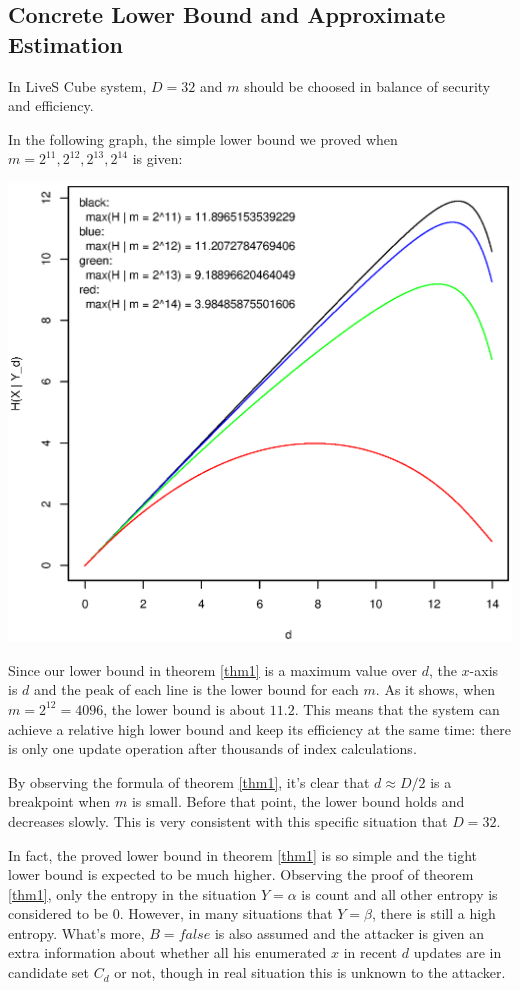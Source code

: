 \documentclass[10pt,a4paper]{article}
\begin{document}
	\subsection{Concrete Lower Bound and Approximate Estimation}
		In LiveS Cube system, $D = 32$ and $m$ should be
		choosed in balance of security and efficiency.
		
		In the following graph, the simple lower
		bound we proved when $m = 2^{11}, 2^{12}, 2^{13}, 2^{14}$ is given:
		
		\begin{center}
		\includegraphics[scale=0.6]{lb_m.eps}
		\end{center}
		
		Since our lower bound in theorem \ref{thm1} is a maximum value
		over $d$, the $x$-axis is $d$ and the peak of each line
		is the lower bound for each $m$. As it shows, when $m = 2^{12} = 4096$, the lower
		bound is about $11.2$. This means that the system can achieve
		a relative high lower bound and keep its efficiency at the same time:
		there is only one update operation after thousands of index calculations.
		
		By observing the formula
		of theorem \ref{thm1}, it's clear that $d \approx D/2$ is a
		breakpoint when $m$ is small. Before that point, the lower bound holds and
		decreases slowly. This is very consistent with this
		specific situation that $D = 32$.
		
		In fact, the proved lower bound in theorem \ref{thm1} is so
		simple and the tight lower bound is expected to be much higher.
		Observing the proof of theorem \ref{thm1}, only the
		entropy in the situation $Y = \alpha$ is count and
		all other entropy is considered to be $0$. However, in
		many situations that $Y = \beta$, there is still a high entropy.
		What's more, $B = false$ is also assumed and the attacker is
		given an extra information about whether all his enumerated $x$
		in recent $d$ updates are in candidate set $C_d$ or not, though
		in real situation this is unknown to the attacker.
		
\end{document}
